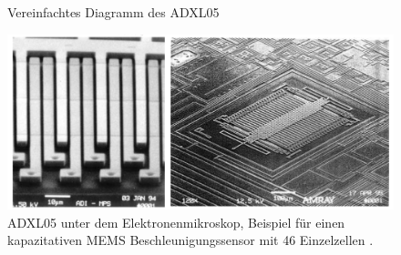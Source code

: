 \documentclass[12pt,a4paper,twoside,BCOR=12.5mm]{scrartcl}
\begin{document}
\begin{figure}[htb]
	\caption{Vereinfachtes Diagramm des ADXL05 \citep{Devices:1996pd}}
	\label{adxl}
\end{figure}

\begin{figure}[htb]
\centering
\includegraphics[scale=1]{adxl_micro.png}
\caption{ADXL05 unter dem Elektronenmikroskop, Beispiel für einen kapazitativen MEMS Beschleunigungssensor mit 46 Einzelzellen \citep{Klingbeil:2006qy}.}
\label{adxl_micro}
\end{figure}
\end{document}
